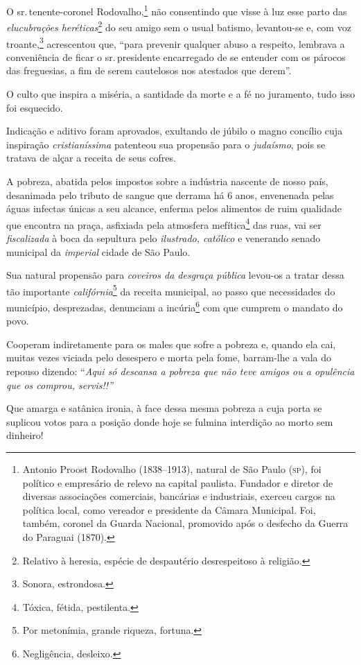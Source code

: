 O sr.\,tenente-coronel Rodovalho,\footnote{Antonio Proost Rodovalho
  (1838--1913), natural de São Paulo (\textsc{sp}), foi político e empresário de
  relevo na capital paulista. Fundador e diretor de diversas associações
  comerciais, bancárias e industriais, exerceu cargos na política local,
  como vereador e presidente da Câmara Municipal. Foi, também, coronel
  da Guarda Nacional, promovido após o desfecho da Guerra do Paraguai
  (1870).} não consentindo que visse à luz esse parto das
\emph{elucubrações heréticas}\footnote{Relativo à heresia, espécie de
  despautério desrespeitoso à religião.} do seu amigo sem o usual
batismo, levantou-se e, com voz troante,\footnote{Sonora, estrondosa.}
acrescentou que, ``para prevenir qualquer abuso a respeito, lembrava a
conveniência de ficar o sr.\,presidente encarregado de se entender com os
párocos das freguesias, a fim de serem cautelosos nos atestados que
derem''.

O culto que inspira a miséria, a santidade da morte e a fé no juramento,
tudo isso foi esquecido.

Indicação e aditivo foram aprovados, exultando de júbilo o magno
concílio cuja inspiração \emph{cristianíssima} patenteou sua propensão
para o \emph{judaísmo}, pois se tratava de alçar a receita de seus
cofres.

A pobreza, abatida pelos impostos sobre a indústria nascente de nosso
país, desanimada pelo tributo de sangue que derrama há 6 anos,
envenenada pelas águas infectas únicas a seu alcance, enferma pelos
alimentos de ruim qualidade que encontra na praça, asfixiada pela
atmosfera mefítica\footnote{Tóxica, fétida, pestilenta.} das ruas, vai
ser \emph{fiscalizada} à boca da sepultura pelo \emph{ilustrado,
católico} e venerando senado municipal da \emph{imperial} cidade de São
Paulo.

Sua natural propensão para \emph{coveiros da desgraça pública} levou-os
a tratar dessa tão importante \emph{califórnia}\footnote{Por
  metonímia, grande riqueza, fortuna.} da receita municipal, ao passo
que necessidades do município, desprezadas, denunciam a
incúria\footnote{Negligência, desleixo.} com que cumprem o mandato do
povo.

Cooperam indiretamente para os males que sofre a pobreza e, quando ela
cai, muitas vezes viciada pelo desespero e morta pela fome, barram-lhe a
vala do repouso dizendo: ``\emph{Aqui só descansa a pobreza que não teve
amigos ou a opulência que os comprou, servis!!''}

Que amarga e satânica ironia, à face dessa mesma pobreza a cuja porta se
suplicou votos para a posição donde hoje se fulmina interdição ao morto
sem dinheiro!

